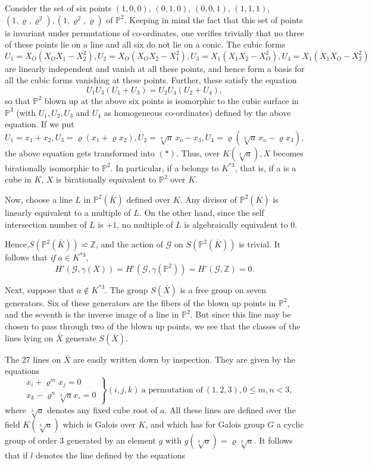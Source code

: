 Consider the set of six points $(1,0,0)$, $(0,1,0)$, $(0, 0,1)$,
$(1,1,1)$, $(1,\varrho, \varrho^2),(1, \varrho^2, \varrho)$ of
$\mathbb{P}^2$. Keeping in mind the fact that this set of 
points is invariant under permutations of co-ordinates, one verifies
trivially that no three of these points lie on a line and all six do
not lie on a conic. The cubic forms $U_1 = X_O(X_O X_1 - X^2_2), U_2 =
X_O (X_O X_2 - X^2_1), U_3 = X_1 (X_1 X_2 - X^2_O), U_4 = X_1 (X_1 X_O
- X^2_2)$ are linearly independent and vanish at all these points, and
hence form a basis for all the cubic forms vanishing at these
points. Further, these satisfy the equation 
$$
U_1 U_3 (U_1+ U_3)= U_2 U_4 (U_2 + U_4),
$$
so that $\mathbb{P}^2$ blown up at the above six points is isomorphic
to the cubic surface in $\mathbb{P}^3$ (with $U_1, U_2 , U_3$ and
$U_4$ as homogeneous co-ordinates) defined by the above equation. If
we put $U_1 =x_1 + x_2 ,U_3 = \varrho (x_1 + \varrho x_2), U_2 =
\sqrt[3]{a} \,  x_o - x_3, U_4 = \varrho (\sqrt[3]{a}  \, x_o- \varrho x_3)$, the
above equation gets transformed into $(*)$. Thus, over
$K(\sqrt[3]{a}), X$ becomes birationally isomorphic to $\mathbb{P}^2$. In
particular, if a belongs to $K^{*3}$, that is, if a is a cube in $K$,
$X$ is birationally equivalent to $\mathbb{P}^2$ over $K$.  

Now, choose a line $L$ in $\mathbb{P}^2(\bar{K})$ defined over
$K$. Any divisor of $\mathbb{P}^2 (\bar{K})$ is linearly equivalent to
a multiple of $L$. On the other hand, since the self intersection
number of $L$ is $+1$, no multiple of $L$ is algebraically equivalent
to $0$. 

Hence,\pageoriginale $S(\mathbb{P}^2 (\bar{K})) \backsimeq \mathbb{Z}$, and the
action of $\mathscr{G}$ on $S(\mathbb{P}^2(\bar{K}))$ is trivial. It
follows that \textit{if} $a \in K^{*3}$, 
$$
H' (\mathscr{G}, \gamma (X))= H' (\mathscr{G}, \gamma (\mathbb{P}^2))=
H' (\mathscr{G}, \mathbb{Z})=0. 
$$

Next, suppose that $a \not\in K^{*3}$. The group $S(\bar{X})$ is a
free group on seven generators. Six of these generators are the fibers
of the blown up points in $\mathbb{P}^2$, and the seventh is the
inverse image of a line in $\mathbb{P}^2$. But since this line may be
chosen to pass through two of the blown up points, we see that the
classes of the lines lying on $\bar{X}$ generate $S(\bar{X})$. 

The 27 lines on $\bar{X}$ are easily written down by inspection. They
are given by the equations 
\begin{equation*}
  \left.
  \begin{aligned}
    &x_i + \varrho^m x_j =0\\
    &x_k - \varrho^n \sqrt[3]{a} x_\circ =0
  \end{aligned}\right\}
(i, j, k) ~\text{a permutation of}~ (1, 2, 3), 0 \leq m, n < 3,
\end{equation*}
where $\sqrt[3]{a}$ denotes any fixed cube root of $a$. All these lines
are defined over the field $K ( \sqrt[3]{a})$ which is Galois over $K$,
and which has for Galois group $G$ a cyclic group of order $3$
generated by an element $g$ with $g(\sqrt[3]{a})= \varrho
\sqrt[3]{a}$. It follows that if $l$ denotes the line defined by the
equations 


